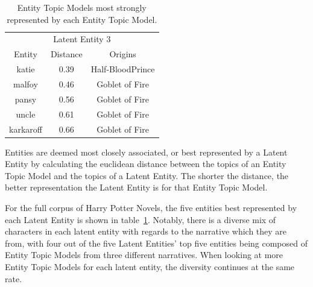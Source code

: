 \documentclass[10pt]{report}
\begin{document}
\begin{table}[h!]
{\begin{tabular}{c | c | c }
    \multicolumn{3}{c}{Latent Entity 3}\\
    Entity    & Distance & Origins\\
    \hline
    katie	    &0.39&	Half-BloodPrince\\
    malfoy	    &0.46&	Goblet of Fire  \\
    pansy	    &0.56&	Goblet of Fire  \\
    uncle	    &0.61&	Goblet of Fire  \\
    karkaroff       &0.66&	Goblet of Fire
  \end{tabular}}
  \caption{Entity Topic Models most strongly represented by each Entity Topic Model.\label{tab:hp_le_fulls}}
\end{table}
\renewcommand{\baselinestretch}{2.0}\normalsize
\renewcommand{\arraystretch}{1.0}

Entities are deemed most closely associated, or best represented by a Latent Entity by calculating the euclidean distance between the topics of an Entity Topic Model and the topics of a Latent Entity. The shorter the distance, the better representation the Latent Entity is for that Entity Topic Model.

For the full corpus of Harry Potter Novels, the five entities best represented by each Latent Entity is shown in table~\ref{tab:hp_le_fulls}. Notably, there is a diverse mix of characters in each latent entity with regards to the narrative which they are from, with four out of the five Latent Entities' top five entities being composed of Entity Topic Models from three different narratives. When looking at more Entity Topic Models for each latent entity, the diversity continues at the same rate.
\end{document}
